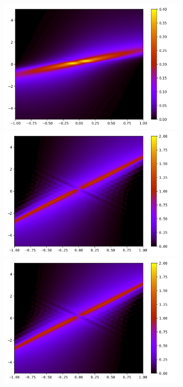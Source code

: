 \documentclass{article}
\numberwithin{equation}{section}
\newcommand{\imh}{\textheight} %
\newcommand{\imw}{\textwidth} %
\begin{document}
\begin{figure}
	\begin{subfigure}{\textwidth}
		\centering
		\includegraphics[height=\imh,width=\imw]{images/fiT20_FD.png}
		\includegraphics[height=\imh,width=\imw]{images/fiT20_512.png}
		\includegraphics[height=\imh,width=\imw]{images/fiT20_512_2.png}

\end{subfigure}
\end{figure}
\end{document}
